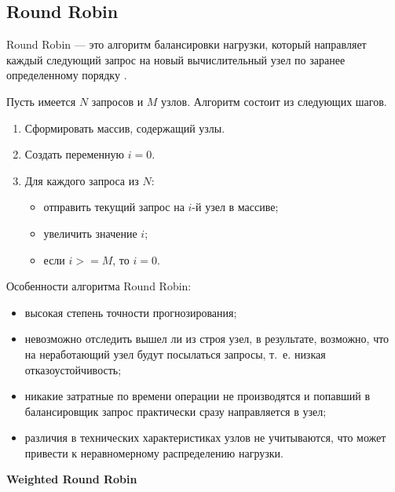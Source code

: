 \subsection{Round Robin}

Round Robin --- это алгоритм балансировки нагрузки, который направляет каждый следующий запрос на новый вычислительный узел по заранее определенному порядку \cite{comp}.

Пусть имеется $N$ запросов и $M$ узлов. Алгоритм состоит из следующих шагов.

\begin{enumerate}
	\item Сформировать массив, содержащий узлы.
	\item Создать переменную $i = 0$.
	\item Для каждого запроса из $N$:
	\begin{itemize}
		\item отправить текущий запрос на $i$-й узел в массиве;
		\item увеличить значение $i$;
		\item если $i >= M$, то $i = 0$.
	\end{itemize}	
\end{enumerate}

Особенности алгоритма Round Robin:
\begin{itemize}
	\item высокая степень точности прогнозирования;
	\item невозможно отследить вышел ли из строя узел, в результате, возможно, что на неработающий узел будут посылаться запросы, т.~е. низкая отказоустойчивость;
	\item никакие затратные по времени операции не производятся и попавший в балансировщик запрос практически сразу направляется в узел;
	\item различия в технических характеристиках узлов не учитываются, что может привести к неравномерному распределению нагрузки.
\end{itemize}


\textbf{Weighted Round Robin}


